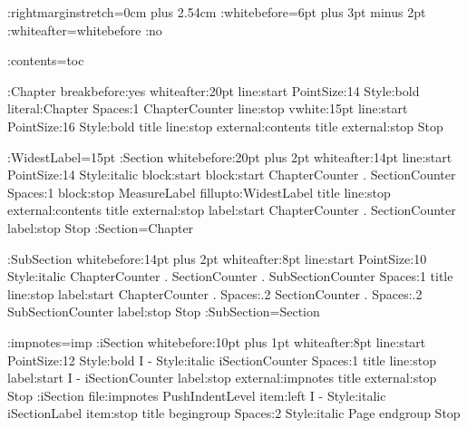 %
%
%
%
%
%
\def\con#1{{\tt#1}}
\def\n#1{{\tt#1}}
\def\file#1{{\tt#1}}

\def\Lollipop{Lollipop}

\Distance:rightmarginstretch={0cm plus 2.54cm}
\Distance:whitebefore={6pt plus 3pt minus 2pt}
\Distance:whiteafter=whitebefore
\FlushRight:no

\DefineExternalFile:contents=toc

\DefineHeading:Chapter
    breakbefore:yes whiteafter:20pt
    line:start PointSize:14 Style:bold literal:Chapter 
        Spaces:1 ChapterCounter line:stop
    vwhite:15pt
    line:start PointSize:16 Style:bold title line:stop
    external:contents title external:stop
    Stop

\AdaptiveDistance:WidestLabel=15pt
\def\MeasureLabel{\ifdim\BlockWidth>\WidestLabel
    \global\WidestLabel\BlockWidth\fi}
\DefineHeading:Section
    whitebefore:{20pt plus 2pt} whiteafter:14pt
    line:start PointSize:14 Style:italic 
        block:start block:start ChapterCounter . SectionCounter
              Spaces:1 block:stop MeasureLabel
              fillupto:WidestLabel
        title line:stop
    external:contents title external:stop
    label:start ChapterCounter . SectionCounter label:stop
    Stop
\GoverningCounter:Section=Chapter

\DefineHeading:SubSection
    whitebefore:{14pt plus 2pt} whiteafter:8pt
    line:start PointSize:10 Style:italic 
        ChapterCounter . SectionCounter . SubSectionCounter 
        Spaces:1 title line:stop
    label:start ChapterCounter . Spaces:.2 SectionCounter 
        . Spaces:.2 SubSectionCounter label:stop
    Stop
\GoverningCounter:SubSection=Section

\DefineExternalFile:impnotes=imp
\DefineHeading:iSection
    whitebefore:{10pt plus 1pt} whiteafter:8pt
    line:start PointSize:12 Style:bold I - 
        Style:italic iSectionCounter
        Spaces:1 title line:stop
    label:start I - iSectionCounter label:stop
    external:impnotes title external:stop
    Stop
\DefineExternalItem:iSection file:impnotes PushIndentLevel
    item:left I - Style:italic iSectionLabel item:stop
    title begingroup Spaces:2 Style:italic Page endgroup
    Stop


